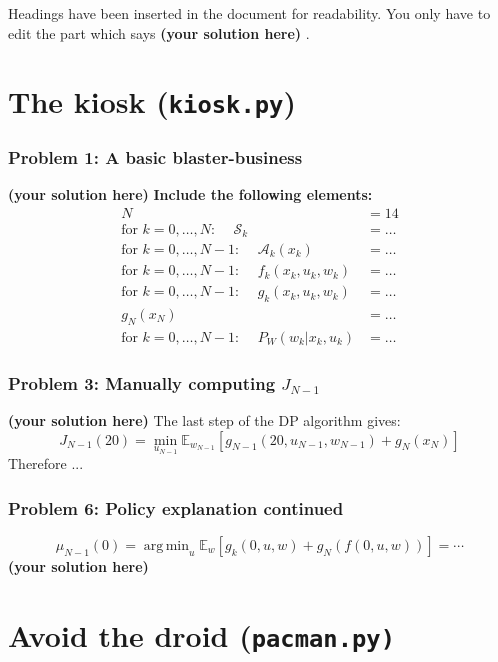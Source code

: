 \documentclass[12pt,twoside]{article}
\newcommand\redt[1]{ {\textcolor[rgb]{0.60, 0.00, 0.00}{\textbf{ #1} } } }
\newcommand{\EE}{\mathbb{E}}
\DeclareMathOperator*{\argmin}{arg\,min}
\newcommand{\yoursolution}{ \redt{(your solution here) } }
\begin{document}

Headings have been inserted in the document for readability. You only have to edit the part which says \yoursolution. 

\section{The kiosk (\texttt{kiosk.py})}
\subsubsection*{{\color{red}Problem 1:  A basic blaster-business}}

\yoursolution 	
\redt{Include the following elements: \begin{align}
	N & = 14 \\
	\mbox{for $k=0,\dots,N$: }\quad	\mathcal{S}_k & = \dots \\
	\mbox{for $k=0,\dots,N-1$: }\quad \mathcal{A}_k(x_k) & = \dots \\
    \mbox{for $k=0,\dots,N-1$: }\quad f_k(x_k, u_k, w_k) & = \dots \\
	\mbox{for $k=0,\dots,N-1$: }\quad g_k(x_k, u_k, w_k) & = \dots \\
	g_N(x_N) & = \dots \\
    \mbox{for $k=0,\dots,N-1$: }\quad P_W(w_k | x_k, u_k) & = \dots
\end{align} }

\subsubsection*{{\color{red}Problem 3:  Manually computing $J_{N-1}$}}
		
	\yoursolution The last step of the DP algorithm gives:
	$$
	J_{N-1}(20)  = \min_{u_{N-1} } \mathbb{E}_{w_{N-1} }\left[ g_{N-1}(20, u_{N-1}, w_{N-1} ) +  g_N(x_N) \right]
	$$
	Therefore ...
	
\subsubsection*{{\color{red}Problem 6:  Policy explanation continued}}
	
	$$\mu_{N-1}(0) = \argmin_u \EE_{w} \left[g_k(0, u, w) + g_N( f(0,u,w) ) \right] = \cdots $$
\yoursolution

\section{Avoid the droid (\texttt{pacman.py)}} 
\end{document}
